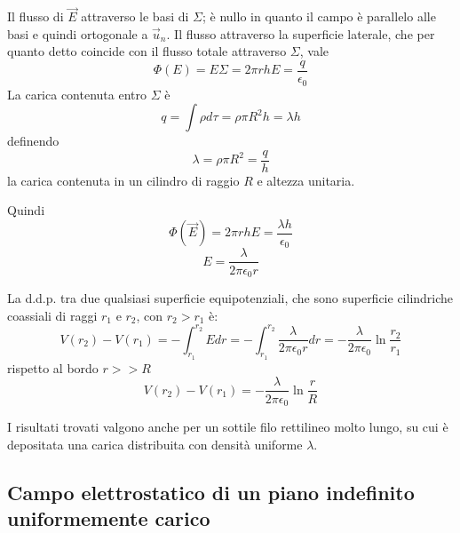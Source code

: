 \documentclass[class=book, crop=false, oneside, 12pt]{standalone}
\begin{document}
Il flusso di \(\overrightarrow{E}\) attraverso le basi di \(\Sigma\); è nullo in quanto il campo è parallelo alle basi e quindi ortogonale a \(\overrightarrow{u}_n\). 
Il flusso attraverso la superficie laterale, che per quanto detto coincide con il flusso totale attraverso \(\Sigma\), vale
\begin{equation*}
    \Phi(E) = E \Sigma = 2 \pi r h E = \frac{q}{\epsilon_0}
\end{equation*} 
La carica contenuta entro \(\Sigma\) è 
\begin{equation*}
    q = \int \rho d \tau = \rho \pi R^2 h = \lambda h
\end{equation*}
definendo
\begin{equation*}
    \lambda = \rho \pi R^2 = \frac{q}{h}
\end{equation*}
la carica contenuta in un cilindro di raggio \(R\) e altezza unitaria.

Quindi
\begin{equation*}
    \Phi(\overrightarrow{E}) = 2 \pi r h E = \frac{\lambda h}{\epsilon_0} 
\end{equation*}
\begin{equation*}
    E = \frac{\lambda}{2 \pi \epsilon_0 r}
\end{equation*}

La d.d.p. tra due qualsiasi superficie equipotenziali, che sono superficie cilindriche coassiali di raggi \(r_1\) e \(r_2\), con \(r_2 > r_1\) è: 
\begin{equation*}
    V(r_2) - V(r_1) = - \int_{r_1}^{r_2} E d r = - \int_{r_1}^{r_2} \frac{\lambda}{2 \pi \epsilon_0 r} d r = - \frac{\lambda}{2 \pi \epsilon_0} \ln \frac{r_2}{r_1}
\end{equation*}
rispetto al bordo \(r >> R\)
\begin{equation*}
    V(r_2) - V(r_1) = - \frac{\lambda}{2 \pi \epsilon_0} \ln \frac{r}{R}
\end{equation*}

I risultati trovati valgono anche per un sottile filo rettilineo molto lungo, su cui è depositata una carica distribuita con densità uniforme \(\lambda\).

\subsection{Campo elettrostatico di un piano indefinito uniformemente carico}
\end{document}
